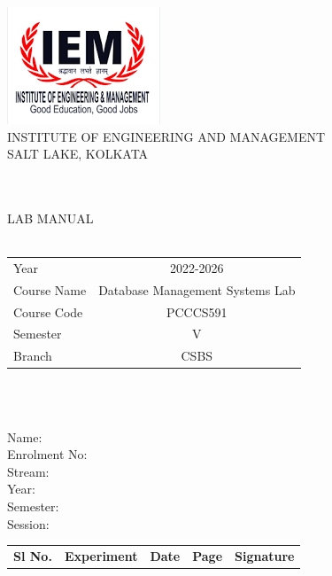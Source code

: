 \documentclass{article}
\begin{document}
\begin{center}
\includegraphics{resources/IEM logo}\\
\uppercase{institute of engineering and management}\\
\uppercase{salt lake, kolkata}\\~\\~\\
\textcolor[HTML]{001F5F}{LAB MANUAL\\~\\
	\begin{tabular}{l@{ : }c}
	Year&2022-2026\\
	Course Name&Database Management Systems Lab\\
	Course Code&PCCCS591\\
	Semester&V\\
	Branch&CSBS\\
	\end{tabular}\\~\\
}
\begin{tcolorbox}
Name:\dotfill\\
Enrolment No:\dotfill\\
Stream:\dotfill\\
Year:\dotfill\\
Semester:\dotfill\\
Session:\dotfill\\
\end{tcolorbox}
\newpage
{}
\begin{tabular}{|p{4em}|p{20em}|p{10em}|p{4em}|p{6em}|}
	\hline
	\textbf{Sl No.} & \textbf{Experiment} & \textbf{Date} & \textbf{Page} & \textbf{Signature}\\


\end{tabular}
\end{center}
\end{document}

